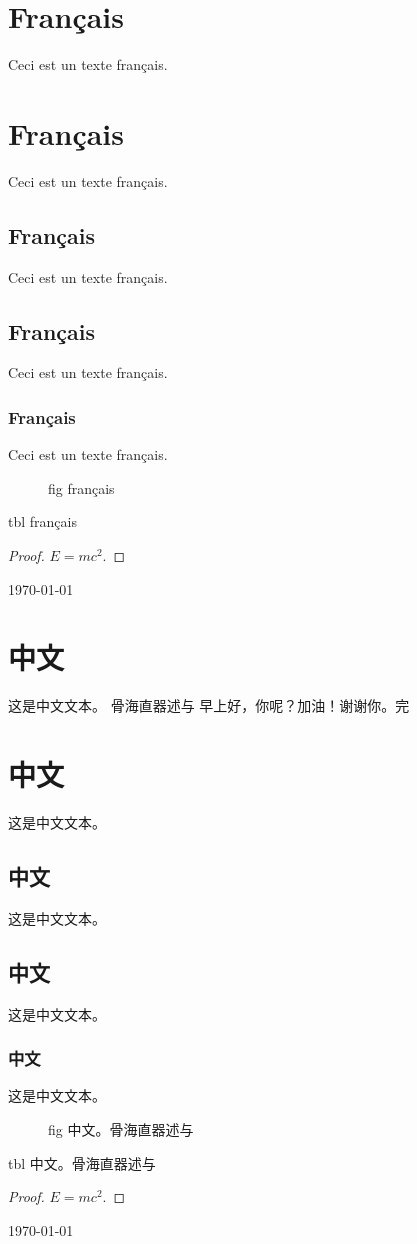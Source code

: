 \documentclass[11pt]{article}
\begin{document}
\begin{french}
\section{Français}
Ceci est un texte français.
\section{Français}
Ceci est un texte français.
\subsection{Français}
Ceci est un texte français.
\subsection{Français}
Ceci est un texte français.
\subsubsection{Français}
Ceci est un texte français.

\begin{figure}
\caption{fig français}
\end{figure}
\begin{table}
\caption{tbl français}
\end{table}
\begin{proof}
$E = mc^2.$
\end{proof}

\today
\end{french}

\begin{chinese}[variant=simplified]
\section{中文}
这是中文文本。
骨海直器述与 早上好，你呢？加油！谢谢你。完
\section{中文}
这是中文文本。
\subsection{中文}
这是中文文本。
\subsection{中文}
这是中文文本。
\subsubsection{中文}
这是中文文本。

\begin{figure}
\caption{fig 中文。骨海直器述与}
\end{figure}
\begin{table}
\caption{tbl 中文。骨海直器述与}
\end{table}
\begin{proof}
$E = mc^2.$
\end{proof}

\today
\end{chinese}
\end{document}
